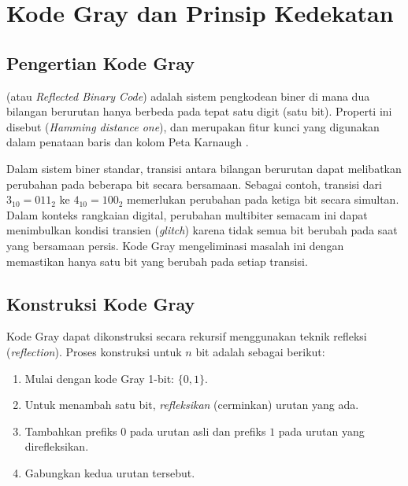 \section{Kode Gray dan Prinsip Kedekatan}

\subsection{Pengertian Kode Gray}

\begin{definisi}
 (atau \textit{Reflected Binary Code}) adalah sistem pengkodean biner di mana dua bilangan berurutan hanya berbeda pada tepat satu digit (satu bit). Properti ini disebut  (\textit{Hamming distance one}), dan merupakan fitur kunci yang digunakan dalam penataan baris dan kolom Peta Karnaugh \cite{wiki_gray_code}.
\end{definisi}

Dalam sistem biner standar, transisi antara bilangan berurutan dapat melibatkan perubahan pada beberapa bit secara bersamaan. Sebagai contoh, transisi dari $3_{10} = 011_2$ ke $4_{10} = 100_2$ memerlukan perubahan pada ketiga bit secara simultan. Dalam konteks rangkaian digital, perubahan multibiter semacam ini dapat menimbulkan kondisi transien (\textit{glitch}) karena tidak semua bit berubah pada saat yang bersamaan persis. Kode Gray mengeliminasi masalah ini dengan memastikan hanya satu bit yang berubah pada setiap transisi.

\subsection{Konstruksi Kode Gray}

Kode Gray dapat dikonstruksi secara rekursif menggunakan teknik refleksi (\textit{reflection}). Proses konstruksi untuk $n$ bit adalah sebagai berikut:

\begin{enumerate}
  \item Mulai dengan kode Gray 1-bit: $\{0, 1\}$.
  \item Untuk menambah satu bit, \textit{refleksikan} (cerminkan) urutan yang ada.
  \item Tambahkan prefiks $0$ pada urutan asli dan prefiks $1$ pada urutan yang direfleksikan.
  \item Gabungkan kedua urutan tersebut.
\end{enumerate}

